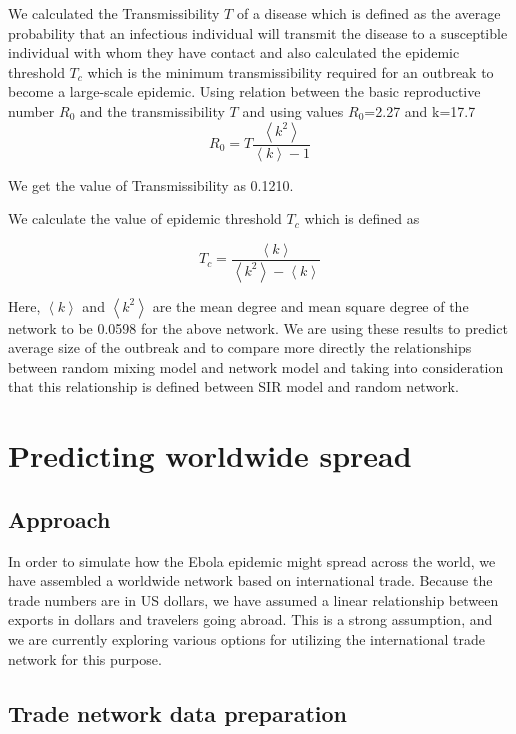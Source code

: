 \documentclass[10pt, journal,onecolumn]{IEEEtran}
\begin{document}
 We calculated the Transmissibility $T$ of a disease which  is defined as the average probability that an infectious
individual will transmit the disease to a susceptible individual with whom they have contact and also calculated the epidemic threshold $T_c$ which is the minimum transmissibility required for an outbreak to become
a large-scale epidemic. Using  relation between the basic reproductive number
$R_0$ and the transmissibility $T$  and using  values $R_0$=2.27 and k=17.7 
\[
R_0 = T  \dfrac{\left\langle k^2 \right\rangle}{\left\langle k \right\rangle-1}
\]

We get the value of Transmissibility as 0.1210.

We calculate the value of epidemic threshold $T_c$  which is defined as 

\[
T_c =\dfrac{\left\langle k \right\rangle}{\left\langle k^2 \right\rangle - \left\langle k \right\rangle}
\]

Here, $\left\langle k \right\rangle$ and $\left\langle k^2 \right\rangle$ are the mean degree and
mean square degree of the network to be 0.0598 for the above network.  We are using these results to predict average size
of the outbreak and to compare more directly the relationships between
random mixing model and network model and taking into consideration that this relationship is defined between SIR model and random network.











\section{Predicting worldwide spread}
\label{sec:Worldwide}

\subsection*{\textbf{Approach}}
In order to simulate how the Ebola epidemic might spread across the world, we have assembled a
worldwide network based on international trade. Because the trade numbers are in US dollars,
we have assumed a linear relationship between exports in dollars and travelers going abroad.
This is a strong assumption, and we are currently exploring various options for utilizing the
international trade network for this purpose.

\subsection*{\textbf{Trade network data preparation}}
\end{document}
